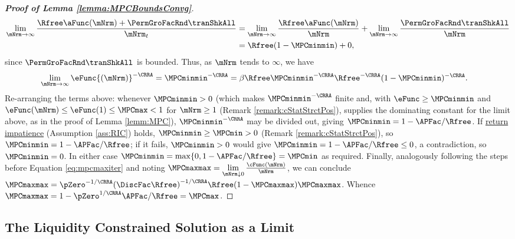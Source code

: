 \documentclass[\econtexRoot/BufferStockTheory]{subfiles}
\begin{document}
\begin{proof}[\textbf{Proof of Lemma \ref{lemma:MPCBoundsConvg}}]
\begin{equation}\begin{gathered}\begin{aligned}
\lim_{\mNrm\rightarrow \infty}\frac{\Rfree \aFunc(\mNrm)+{\PermGroFacRnd}{\tranShkAll}}{\mNrm_{t}} &  = \lim_{\mNrm \rightarrow \infty}\frac{\Rfree \aFunc(\mNrm)}{\mNrm} + \lim_{\mNrm\rightarrow \infty}\frac{{\PermGroFacRnd}{\tranShkAll}}{\mNrm} \\
			& = \Rfree (1- \MPCminmin) + 0, 
\end{aligned}\end{gathered}\end{equation}
since ${\PermGroFacRnd}{\tranShkAll}$ is bounded.
Thus, as $\mNrm$ tends to $\infty$, we have
%
\begin{equation}\begin{gathered}\begin{aligned} %
 \lim\limits_{\mNrm\rightarrow \infty}\eFunc{(\mNrm)}^{-\CRRA}  & =  \MPCminmin^{-\CRRA} = \beta\Rfree\MPCminmin^{-\CRRA}\Rfree^{-\CRRA} (1- \MPCminmin) ^{-\CRRA}. 
\end{aligned}\end{gathered}\end{equation}
%
Re-arranging the terms above: whenever $\MPCminmin>0$ (which makes $\MPCminmin^{-\CRRA}$ finite and, with $\eFunc\geq\MPCminmin$ and $\eFunc(\mNrm)\leq\eFunc(1)\leq\MPCmax<1$ for $\mNrm\geq 1$ (Remark \ref{remark:cStatStrctPos}), supplies the dominating constant for the limit above, as in the proof of Lemma \ref{lemm:MPC}), $\MPCminmin^{-\CRRA}$ may be divided out, giving $\MPCminmin =1-  \APFac/\Rfree$. If \hyperlink{RIC}{return impatience} (Assumption \ref{ass:RIC}) holds, $\MPCminmin\geq\MPCmin>0$ (Remark \ref{remark:cStatStrctPos}), so $\MPCminmin=1-\APFac/\Rfree$; if it fails, $\MPCminmin>0$ would give $\MPCminmin=1-\APFac/\Rfree\leq 0$, a contradiction, so $\MPCminmin=0$. In either case $\MPCminmin=\max\{0,1-\APFac/\Rfree\}=\MPCmin$ as required.
Finally, analogously following the steps before Equation \eqref{eq:mpcmaxiter} and noting $\MPCmaxmax = \lim\limits_{\mNrm\downarrow 0}\frac{\cFunc(\mNrm)}{\mNrm}$, we can conclude $\MPCmaxmax  = \pZero^{-1/\CRRA} {(\DiscFac
\Rfree)}^{-1/\CRRA}\Rfree(1-\MPCmaxmax)\MPCmaxmax$.
Whence $\MPCmaxmax = 1- \pZero^{1/\CRRA}\APFac/\Rfree = \MPCmax$.




%
\end{proof}

\subsection{The Liquidity Constrained Solution as a Limit}\label{sec:LiqConstrAsLimit}
\end{document}
